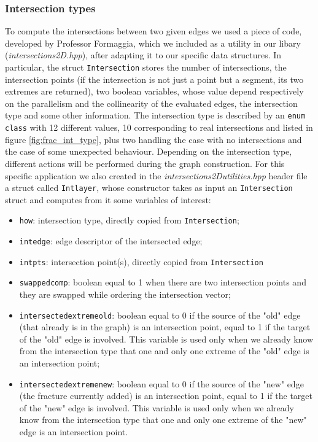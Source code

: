\documentclass[10pt]{article} %
\begin{document}
	\subsubsection{Intersection types}
	To compute the intersections between two given edges we used a piece of code, developed by Professor Formaggia, which we included as a utility in our libary (\textit{intersections2D.hpp}), after adapting it to our specific data structures. In particular, the struct \texttt{Intersection} stores the number of intersections, the intersection points (if the intersection is not just a point but a segment, its two extremes are returned), two boolean variables, whose value depend respectively on the parallelism and the collinearity of the evaluated edges, the intersection type and some other information.\newline
	The intersection type is described by an \texttt{enum class} with 12 different values, 10 corresponding to real intersections and listed in figure \ref{fig:frac_int_type}, plus two handling the case with no intersections and the case of some unexpected behaviour. Depending on the intersection type, different actions will be performed during the graph construction. \newline
	For this specific application we also created in the \textit{intersections2D\textunderscore utilities.hpp} header file a struct called \texttt{Int\textunderscore layer}, whose constructor takes as input an \texttt{Intersection} struct and computes from it some variables of interest:
	\begin{itemize}
		\item \texttt{how}: intersection type, directly copied from \texttt{Intersection};
		\item \texttt{int\textunderscore edge}: edge descriptor of the intersected edge;
		\item \texttt{int\textunderscore pts}: intersection point(s), directly copied from \texttt{Intersection}
		\item \texttt{swapped\textunderscore comp}: boolean equal to 1 when there are two intersection points and they are swapped while ordering the intersection vector;
		\item \texttt{intersected\textunderscore extreme\textunderscore old}: boolean equal to 0 if the source of the "old" edge (that already is in the graph) is an intersection point, equal to 1 if the target of the "old" edge is involved. This variable is used only when we already know from the intersection type that one and only one extreme of the "old" edge is an intersection point;
		\item \texttt{intersected\textunderscore extreme\textunderscore new}: boolean equal to 0 if the source of the "new" edge (the fracture currently added) is an intersection point, equal to 1 if the target of the "new" edge is involved. This variable is used only when we already know from the intersection type that one and only one extreme of the "new" edge is an intersection point.
	\end{itemize}
	
\end{document}
